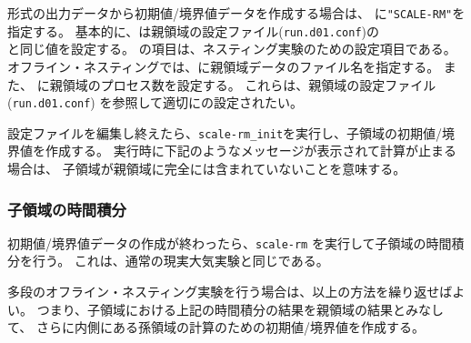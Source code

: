 \scalerm 形式の出力データから初期値/境界値データを作成する場合は、
に\verb|"SCALE-RM"|を指定する。
基本的に、は親領域の設定ファイル(\verb|run.d01.conf|)の\\
と同じ値を設定する。
%
の項目は、ネスティング実験のための設定項目である。
オフライン・ネスティングでは、に親領域データのファイル名を指定する。
また、 に親領域のプロセス数を設定する。
これらは、親領域の設定ファイル(\verb|run.d01.conf|) を参照して適切にの設定されたい。


設定ファイルを編集し終えたら、\verb|scale-rm_init|を実行し、子領域の初期値/境界値を作成する。
実行時に下記のようなメッセージが表示されて計算が止まる場合は、
子領域が親領域に完全には含まれていないことを意味する。


\subsubsection{子領域の時間積分}
初期値/境界値データの作成が終わったら、\verb|scale-rm| を実行して子領域の時間積分を行う。
これは、通常の現実大気実験と同じである。

多段のオフライン・ネスティング実験を行う場合は、以上の方法を繰り返せばよい。
つまり、子領域における上記の時間積分の結果を親領域の結果とみなして、
さらに内側にある孫領域の計算のための初期値/境界値を作成する。

